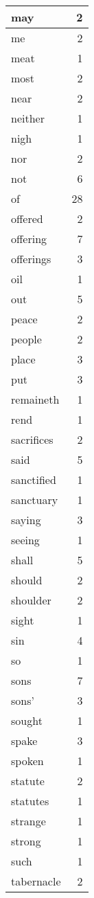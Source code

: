 \begin{center}
\begin{longtable}{l|r}
may & 2 \\ \hline
me & 2 \\ \hline
meat & 1 \\ \hline
most & 2 \\ \hline
near & 2 \\ \hline
neither & 1 \\ \hline
nigh & 1 \\ \hline
nor & 2 \\ \hline
not & 6 \\ \hline
of & 28 \\ \hline
offered & 2 \\ \hline
offering & 7 \\ \hline
offerings & 3 \\ \hline
oil & 1 \\ \hline
out & 5 \\ \hline
peace & 2 \\ \hline
people & 2 \\ \hline
place & 3 \\ \hline
put & 3 \\ \hline
remaineth & 1 \\ \hline
rend & 1 \\ \hline
sacrifices & 2 \\ \hline
said & 5 \\ \hline
sanctified & 1 \\ \hline
sanctuary & 1 \\ \hline
saying & 3 \\ \hline
seeing & 1 \\ \hline
shall & 5 \\ \hline
should & 2 \\ \hline
shoulder & 2 \\ \hline
sight & 1 \\ \hline
sin & 4 \\ \hline
so & 1 \\ \hline
sons & 7 \\ \hline
sons' & 3 \\ \hline
sought & 1 \\ \hline
spake & 3 \\ \hline
spoken & 1 \\ \hline
statute & 2 \\ \hline
statutes & 1 \\ \hline
strange & 1 \\ \hline
strong & 1 \\ \hline
such & 1 \\ \hline
tabernacle & 2 \\ \hline

\end{longtable}
\end{center}
